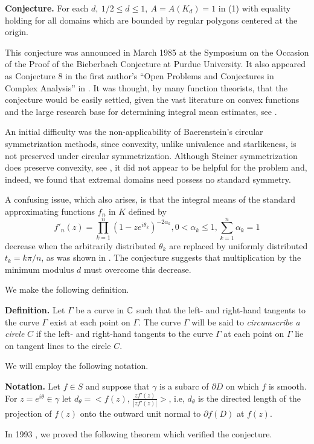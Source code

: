 {\bf Conjecture.} For each $d,\: 1/2\leq d\leq 1,\: A=A(K_d)=1$ in
(1) with equality holding for all domains which are bounded by
regular polygons centered at the origin.

This conjecture was announced in March 1985 at the Symposium on the
Occasion of the Proof of the Bieberbach Conjecture at Purdue
University.  It also appeared as Conjecture 8 in the first author's
``Open Problems and Conjectures in Complex Analysis'' in \cite{Ba}.  It
was thought, by many function theorists, that the conjecture would be
easily settled, given the vast literature on convex functions and the
large research base for determining integral mean estimates, see
\cite{Du}.

An initial difficulty was the non-applicability of Baerenstein's
circular symmetrization methods, since convexity, unlike univalence
and starlikeness, is not preserved under circular symmetrization.
Although Steiner symmetrization does preserve convexity, see \cite{Va}, it
did not appear to be helpful for the problem and, indeed, we found
that extremal domains need possess no standard symmetry.

A confusing issue, which also arises, is that the integral means of
the standard approximating functions $f_n$ in $K$ defined by
$$f'_n(z)=\prod^n_{k=1}(1-ze^{i\theta_k})^{-2\alpha_k},0<\alpha_k\leq
1,\sum^n_{k=1}\alpha_k=1$$ 
decrease when the arbitrarily distributed $\theta_k$ are replaced by
uniformly distributed $t_k=k\pi/n$, as was shown in \cite{Zh}.  The
conjecture suggests that multiplication by the minimum modulus $d$
must overcome this decrease.

We make the following definition.

{\bf Definition.}  Let $\Gamma$ be a curve in $\Bbb C$ such that the
left- and right-hand tangents to the curve $\Gamma$ exist at each
point on $\Gamma$.  The curve $\Gamma$ will be said to {\em
circumscribe a circle} $C$ if the left- and right-hand tangents to
the curve $\Gamma$ at each point on $\Gamma$ lie on tangent lines to
the circle $C$.

We will employ the following notation.

{\bf Notation.} Let $f\in S$ and suppose that $\gamma$ is a subarc of
$\partial D$ on which $f$ is smooth.  For $z=e^{i\theta}\in\gamma$
let $d_{\theta}=<f(z)$, $\frac{zf'(z)}{|zf'(z)|}>$, i.e, $d_\theta$
is the directed length of the projection of $f(z)$ onto the outward
unit normal to $\partial f(D)$ at $f(z)$.

In 1993 \cite{BaPe2}, we proved the following theorem which verified the
conjecture.

